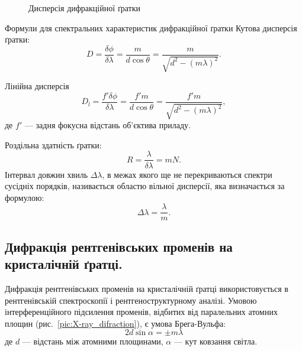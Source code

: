 \begin{figure}[h!]\centering
    
    \caption{Дисперсія дифракційної ґратки}
    \label{pic:slotd_dispersion}
\end{figure}

\begin{Theory}{Формули для спектральних характеристик дифракційної ґратки}
    Кутова дисперсія ґратки:
    \begin{equation}\label{eq:Difraction_angular_dispersion}
        D = \frac{\delta\phi}{\delta\lambda} = \frac{m}{d\cos\theta} = \frac{m}{\sqrt{d^2 - (m\lambda)^2}}.
    \end{equation}

    Лінійна дисперсія
    \begin{equation}\label{eq:Difraction_linear_dispersion}
        D_l = \frac{f'\delta\phi}{\delta\lambda} = \frac{f'm}{d\cos\theta} = \frac{f'm}{\sqrt{d^2 - (m\lambda)^2}},
    \end{equation}
    де $f'$ --- задня фокусна відстань об'єктива приладу.

    Роздільна здатність ґратки:
    \begin{equation}\label{eq:Difraction_Slots_resolution}
        R = \frac{\lambda}{\delta\lambda} = mN.
    \end{equation}
    Інтервал довжин хвиль $\Delta\lambda$, в межах якого ще не перекриваються спектри сусідніх порядків, називається областю вільної дисперсії, яка визначається за формулою:
    \begin{equation}\label{eq:Difraction_free_dispersion}
        \Delta\lambda = \frac{\lambda}{m}.
    \end{equation}
\end{Theory}




\subsection*{Дифракція рентгенівських променів на кристалічній ґратці.}


Дифракція рентгенівських променів на кристалічній ґратці
використовується в рентгенівській спектроскопії і рентгеноструктурному
аналізі. Умовою інтерференційного підсилення променів, відбитих від
паралельних атомних площин (рис.~\ref{pic:X-ray_difraction}), є умова Брега-Вульфа:
\begin{equation}\label{eq:Brag-Wolf}
    2d\sin\alpha = \pm m\lambda
\end{equation}
де $d$ --- відстань між атомними площинами, $\alpha$ --- кут ковзання світла.


